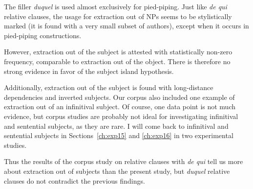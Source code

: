 The filler \emph{duquel} is used almost exclusively for pied-piping. Just like \emph{de qui} relative clauses, the usage for extraction out of NPs seems to be stylistically marked (it is found with a very small subset of authors), except when it occurs  in pied-piping constructions.

However, extraction out of the subject is attested with statistically non-zero frequency, comparable to extraction out of the object. There is therefore no strong evidence in favor of the subject island hypothesis. 

Additionally, extraction out of the subject is found with long-distance dependencies and inverted subjects. Our corpus also included one example of extraction out of an infinitival subject. Of course, one data point is not much evidence, but corpus studies are probably not ideal for investigating infinitival and sentential subjects, as they are rare. I will come back to infinitival and sentential subjects in Sections~\ref{ch:exp15} and \ref{ch:exp16} in two experimental studies.

Thus the results of the corpus study on relative clauses with \emph{de qui} tell us more about extraction out of subjects than the present study, but \emph{duquel} relative clauses do not contradict the previous findings.
